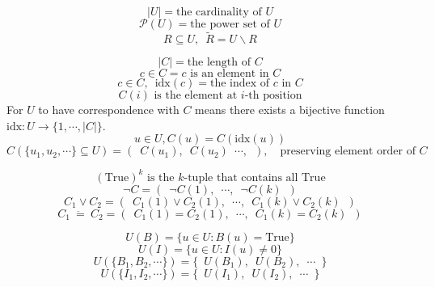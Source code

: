 \documentclass{article}
\begin{document}
\[ |U| = \text{the cardinality of } U \]
\[ \mathcal{P}(U) = \text{the power set of } U \]
\[ R \subseteq U,\enspace \widetilde{R} = U \backslash R \]

\[ |C| = \text{the length of } C \]
\[ c \in C = c \text{ is an element in } C \]
\[ c \in C,\enspace \mathrm{idx}(c) = \text{the index of } c \text{ in } C \]
\[ C(i) \text{ is the element at } i \text{-th position} \]
For \(U\) to have correspondence with \(C\) means there exists a bijective function \(\mathrm{idx} : U \to \{1, \cdots, |C|\}\).
\[ u \in U, C(u) = C(\mathrm{idx}(u)) \]
\[ C(\{u_1, u_2, \cdots\} \subseteq U) = (\enspace C(u_1),\enspace C(u_2)\enspace \cdots,\enspace ), \quad \text{preserving element order of } C \]

\[ (\mathrm{True})^k \text{ is the } k \text{-tuple that contains all } \mathrm{True} \]
\[ \neg C = (\enspace \neg C(1),\enspace \cdots,\enspace \neg C(k)\enspace ) \]
\[ C_1 \vee C_2 = (\enspace C_1(1) \vee C_2(1),\enspace \cdots,\enspace C_1(k) \vee C_2(k)\enspace ) \]
\[ C_1\ \ddot{=}\ C_2 = (\enspace C_1(1) = C_2(1),\enspace \cdots,\enspace C_1(k) = C_2(k)\enspace ) \]

\[ U(B) = \{ u \in U : B(u) = \mathrm{True} \} \]
\[ U(I) = \{ u \in U : I(u) \neq 0 \} \]
\[ U(\{B_1, B_2, \cdots\}) = \{\enspace U(B_1),\enspace U(B_2),\enspace \cdots\enspace \} \]
\[ U(\{I_1, I_2, \cdots\}) = \{\enspace U(I_1),\enspace U(I_2),\enspace \cdots\enspace \} \]
\end{document}

